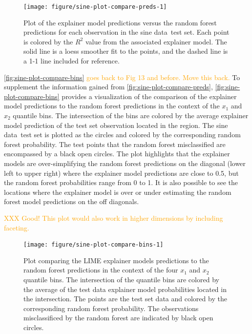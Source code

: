 \documentclass[AMS,STIX2COL]{WileyNJD-v2}\usepackage[]{graphicx}\usepackage[]{color}
\newenvironment{knitrout}{}{} %
\newcommand{\hh}[1]{\textcolor{orange}{#1}}
\newcommand{\data}{sine data}
\begin{document}
{\begin{figure}[!t]
\begin{knitrout}
\color{fgcolor}
\texttt{[image: figure/sine-plot-compare-preds-1]} 

\end{knitrout}
\caption{Plot of the explainer model predictions versus the random forest predictions for each observation in the \data \ test set. Each point is colored by the $R^2$ value from the associated explainer model. The solid line is a loess smoother fit to the points, and the dashed line is a 1-1 line included for reference.}
\label{fig:sine-plot-compare-preds}
\end{figure}

\hh{\autoref{fig:sine-plot-compare-bins} goes back to Fig 13 and before. Move this back.}
To supplement the information gained from \autoref{fig:sine-plot-compare-preds}, \autoref{fig:sine-plot-compare-bins} provides a visualization of the comparison of the explainer model predictions to the random forest predictions in the context of the $x_1$ and $x_2$ quantile bins. The intersection of the bins are colored by the average explainer model prediction of the test set observation located in the region. The \data \ test set is plotted as the circles and colored by the corresponding random forest probability. The test points that the random forest misclassified are encompassed by a black open circles. The plot highlights that the explainer models are over-simplifying the random forest predictions on the diagonal (lower left to upper right) where the explainer model predictions are close to 0.5, but the random forest probabilities range from 0 to 1. It is also possible to see the locations where the explainer model is over or under estimating the random forest model predictions on the off diagonals.

\hh{XXX Good! This plot would also work in higher dimensions by including faceting.}
\begin{figure}[!t]
\begin{knitrout}
\color{fgcolor}
\texttt{[image: figure/sine-plot-compare-bins-1]} 

\end{knitrout}
\caption{Plot comparing the LIME explainer models predictions to the random forest predictions in the context of the four $x_1$ and $x_2$ quantile bins. The intersection of the quantile bins are colored by the average of the test data explainer model probabilities located in the intersection. The points are the test set data and colored by the corresponding random forest probability. The observations misclassificed by the random forest are indicated by black open circles.}
\label{fig:sine-plot-compare-bins}
\end{figure}

}
\end{document}
